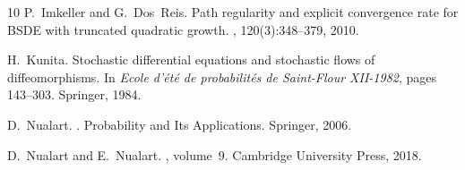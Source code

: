 \documentclass[12,english]{amsart}
\theoremstyle{plain}
\theoremstyle{definition}
\theoremstyle{plain}
\theoremstyle{plain}
\theoremstyle{remark}
\begin{document}
\begin{thebibliography}{10}
P.~Imkeller and G.~Dos~Reis.
\newblock Path regularity and explicit convergence rate for {BSDE} with
  truncated quadratic growth.
, 120(3):348--379,
  2010.

H.~Kunita.
\newblock Stochastic differential equations and stochastic flows of
  diffeomorphisms.
\newblock In {\em Ecole d'{\'e}t{\'e} de probabilit{\'e}s de Saint-Flour
  XII-1982}, pages 143--303. Springer, 1984.

D.~Nualart.
.
\newblock Probability and Its Applications. Springer, 2006.

D.~Nualart and E.~Nualart.
, volume~9.
\newblock Cambridge University Press, 2018.

\end{thebibliography}
\end{document}
